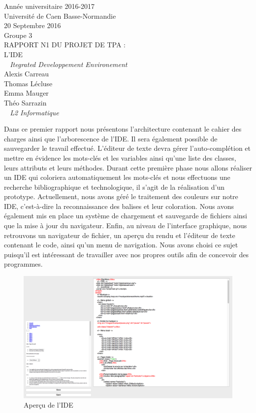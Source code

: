 \documentclass[a4paper,12pt]{article} %
\begin{document}

\begin{titlepage}
\begin{center}
\Large{Année universitaire 2016-2017}\\
\Large{Université de Caen Basse-Normandie}\\[1cm]
\Large{20 Septembre 2016}\\
\Large{Groupe 3}\\
\vspace{5cm}
\huge{RAPPORT N1 DU PROJET DE TPA :}\\
L'IDE\\
\normalsize{\textit{ ~ Itegrated Developpement Environement}}\\
\vspace{5cm}
\huge{}
Alexis Carreau\\
Thomas Lécluse\\
Emma Mauger\\
Théo Sarrazin\\
\normalsize{\textit{ ~ L2 Informatique}}\\
\medskip
\vspace{2cm}

\end{center}
\end{titlepage}

\newpage

Dans ce premier rapport nous présentons l’architecture contenant le cahier des charges ainsi que l’arborescence de l’IDE. Il sera également possible de sauvegarder le travail effectué. L’éditeur de texte devra gérer l’auto-complétion et mettre en évidence les mots-clés et les variables ainsi qu’une liste des classes, leurs attributs et leurs méthodes. Durant cette première phase nous allons réaliser un IDE qui coloriera automatiquement les mots-clés et nous effectuons une recherche bibliographique et technologique, il s’agit de la réalisation d’un prototype. Actuellement, nous avons géré le traitement des couleurs sur notre IDE, c’est-à-dire la reconnaissance des balises et leur coloration. Nous avons également mis en place un système de chargement et sauvegarde de fichiers ainsi que la mise à jour du navigateur. Enfin, au niveau de l'interface graphique, nous retrouvons un navigateur de fichier, un aperçu du rendu et l’éditeur de texte contenant le code, ainsi qu'un menu de navigation. Nous avons choisi ce sujet puisqu’il est intéressant de travailler avec nos propres outils afin de concevoir des programmes.

\vspace{3cm}

\begin{figure}[h!]
	\includegraphics[scale=0.35]{images/IDE.png}
	\caption{Aperçu de l'IDE}
\end{figure}
\end{document}
